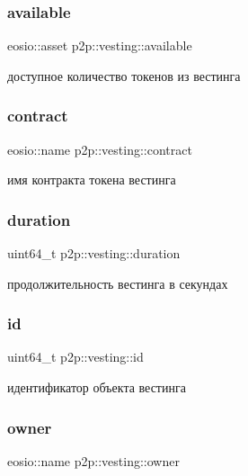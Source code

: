 \subsubsection{\texorpdfstring{available}{available}}
{\footnotesize\ttfamily eosio\+::asset p2p\+::vesting\+::available}

доступное количество токенов из вестинга \mbox{\label{structp2p_1_1vesting_aa514aefb9ae797ecbf711997efb94d5b}} 
\subsubsection{\texorpdfstring{contract}{contract}}
{\footnotesize\ttfamily eosio\+::name p2p\+::vesting\+::contract}

имя контракта токена вестинга \mbox{\label{structp2p_1_1vesting_a86ada5ec19fb224f483ab95bf5908547}} 
\subsubsection{\texorpdfstring{duration}{duration}}
{\footnotesize\ttfamily uint64\+\_\+t p2p\+::vesting\+::duration}

продолжительность вестинга в секундах \mbox{\label{structp2p_1_1vesting_af92c78d429a89e9b6ce552ef480794d5}} 
\subsubsection{\texorpdfstring{id}{id}}
{\footnotesize\ttfamily uint64\+\_\+t p2p\+::vesting\+::id}

идентификатор объекта вестинга \mbox{\label{structp2p_1_1vesting_a46a58437b03f9c7947c76e91f358003e}} 
\subsubsection{\texorpdfstring{owner}{owner}}
{\footnotesize\ttfamily eosio\+::name p2p\+::vesting\+::owner}

